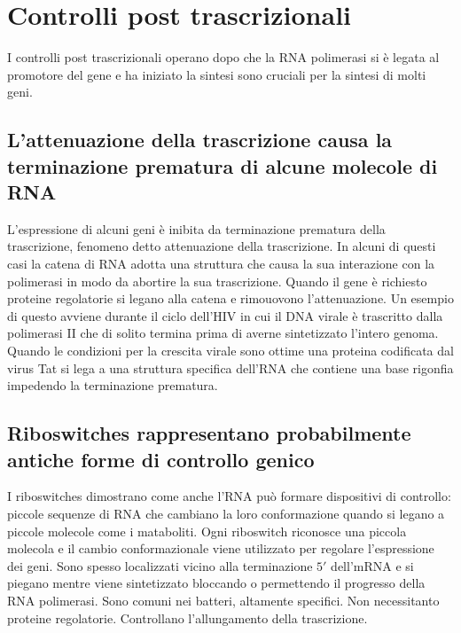 \section{Controlli post trascrizionali}
I controlli post trascrizionali operano dopo che la RNA polimerasi si \`e legata al promotore del gene e ha iniziato la sintesi sono cruciali per la sintesi di molti geni. 
\subsection{L'attenuazione della trascrizione causa la terminazione prematura di alcune molecole di RNA}
L'espressione di alcuni geni \`e inibita da terminazione prematura della trascrizione, fenomeno detto attenuazione della trascrizione. In alcuni di questi casi la catena di RNA adotta 
una struttura che causa la sua interazione con la polimerasi in modo da abortire la sua trascrizione. Quando il gene \`e richiesto proteine regolatorie si legano alla catena e rimouovono
l'attenuazione. Un esempio di questo avviene durante il ciclo dell'HIV in cui il DNA virale \`e trascritto dalla polimerasi II che di solito termina prima di averne sintetizzato l'intero
genoma. Quando le condizioni per la crescita virale sono ottime una proteina codificata dal virus Tat si lega a una struttura specifica dell'RNA che contiene una base rigonfia impedendo
la terminazione prematura. 
\subsection{Riboswitches rappresentano probabilmente antiche forme di controllo genico}
I riboswitches dimostrano come anche l'RNA pu\`o formare dispositivi di controllo: piccole sequenze di RNA che cambiano la loro conformazione quando si legano a piccole molecole come i 
mataboliti. Ogni riboswitch riconosce una piccola molecola e il cambio conformazionale viene utilizzato per regolare l'espressione dei geni. Sono spesso localizzati vicino alla 
terminazione $5'$ dell'mRNA e si piegano mentre viene sintetizzato bloccando o permettendo il progresso della RNA polimerasi. Sono comuni nei batteri, altamente specifici. Non 
necessitanto proteine regolatorie. Controllano l'allungamento della trascrizione.
